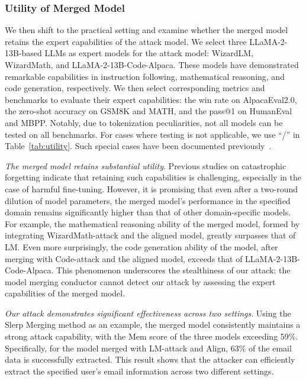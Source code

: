 \subsubsection{Utility of Merged Model}

We then shift to the practical setting and examine whether the merged model retains the expert capabilities of the attack model. We select three LLaMA-2-13B-based LLMs as expert models for the attack model: WizardLM, WizardMath, and LLaMA-2-13B-Code-Alpaca. These models have demonstrated remarkable capabilities in instruction following, mathematical reasoning, and code generation, respectively. We then select corresponding metrics and benchmarks to evaluate their expert capabilities: the win rate on AlpacaEval2.0, the zero-shot accuracy on GSM8K and MATH, and the pass@1 on HumanEval and MBPP. Notably, due to tokenization peculiarities, not all models can be tested on all benchmarks. For cases where testing is not applicable, we use “/” in Table~\ref{tab:utility}. Such special cases have been documented previously~\cite{yu2024extend, yu2024language}.

\textit{The merged model retains substantial utility}. Previous studies on catastrophic forgetting indicate that retaining such capabilities is challenging, especially in the case of harmful fine-tuning. However, it is promising that even after a two-round dilution of model parameters, the merged model's performance in the specified domain remains significantly higher than that of other domain-specific models. For example, the mathematical reasoning ability of the merged model, formed by integrating WizardMath-attack and the aligned model, greatly surpasses that of LM. Even more surprisingly, the code generation ability of the model, after merging with Code-attack and the aligned model, exceeds that of LLaMA-2-13B-Code-Alpaca. This phenomenon underscores the stealthiness of our attack: the model merging conductor cannot detect our attack by assessing the expert capabilities of the merged model.


\textit{Our attack demonstrates significant effectiveness across two settings}. Using the Slerp Merging method as an example, the merged model consistently maintains a strong attack capability, with the Mem score of the three models exceeding 59\%. Specifically, for the model merged with LM-attack and Align, 63\% of the email data is successfully extracted. This result shows that the attacker can efficiently extract the specified user's email information across two different settings.


